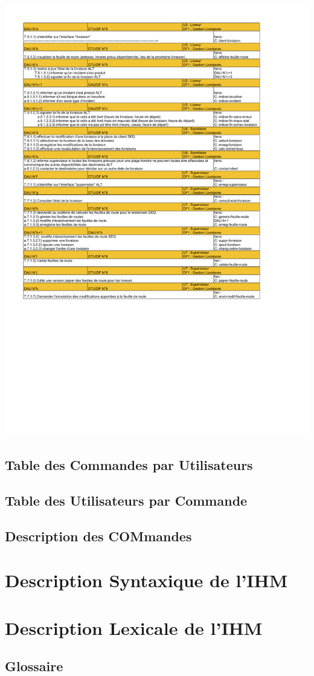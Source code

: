 \documentclass{report}
\begin{document}
\includegraphics[scale = 0.7]{images/DAU.pdf}

\section{Table des Commandes par Utilisateurs}

\section{Table des Utilisateurs par Commande}

\section{Description des COMmandes}


\chapter{Description Syntaxique de l'IHM}





\chapter{Description Lexicale de l'IHM}


\begin{appendices}


\chapter{Glossaire}

\end{appendices}
\end{document}
